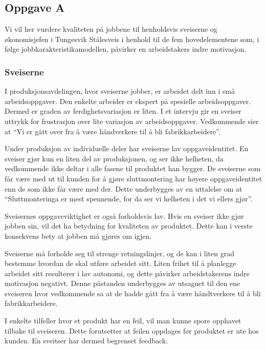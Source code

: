 
\subsection{Oppgave A}
Vi vil her vurdere kvaliteten på jobbene til henholdsvis sveiserne og økonomisjefen i Tungesvik Stålesveis i henhold til de fem hovedelementene som, i følge jobbkarakteristikamodellen, påvirker en arbeidstakers indre motivasjon.

\subsubsection{Sveiserne}
I produksjonsavdelingen, hvor sveiserne jobber, er arbeidet delt inn i små arbeidsoppgaver.
Den enkelte arbeider er ekspert på spesielle arbeidsoppgaver.
Dermed er graden av ferdighetsvariasjon er liten.
I et intervju gir en sveiser uttrykk for frustrasjon over lite variasjon av arbeidsoppgaver.
Vedkommende sier at “Vi er gått over fra å være håndverkere til å bli fabrikkarbeidere”.

Under produksjon av individuelle deler har sveiserne lav oppgaveidentitet.
En sveiser gjør kun en liten del av produksjonen, og ser ikke helheten, da vedkommende ikke deltar i alle fasene til produktet han bygger.
De sveiserne som får være med ut til kunden for å gjøre sluttmontering har høyere oppgaveidentitet enn de som ikke får være med der.
Dette underbygges av en uttalelse om at “Sluttmonteringa er mest spennende, for da ser vi helheten i det vi ellers gjør”.

Sveisernes oppgaveviktighet er også forholdsvis lav.
Hvis en sveiser ikke gjør jobben sin, vil det ha betydning for kvaliteten av produktet.
Dette kan i verste konsekvens bety at jobben må gjøres om igjen.

Sveiserne må forholde seg til strenge retningslinjer, og de kan i liten grad bestemme hvordan de skal utføre arbeidet sitt.
Liten frihet til å planlegge arbeidet sitt resulterer i lav autonomi, og dette påvirker arbeidstakerens indre motivasjon negativt.
Denne påstanden underbygges av utsagnet til den ene sveiseren hvor vedkommende sa at de hadde gått fra å være håndtverkere til å bli fabrikkarbeidere.

I enkelte tilfeller hvor et produkt har en feil, vil man kunne spore opphavet tilbake til sveiseren.
Dette forutsetter at feilen oppdages før produktet er ute hos kunden.
En sveitser har dermed begrenset feedback.

